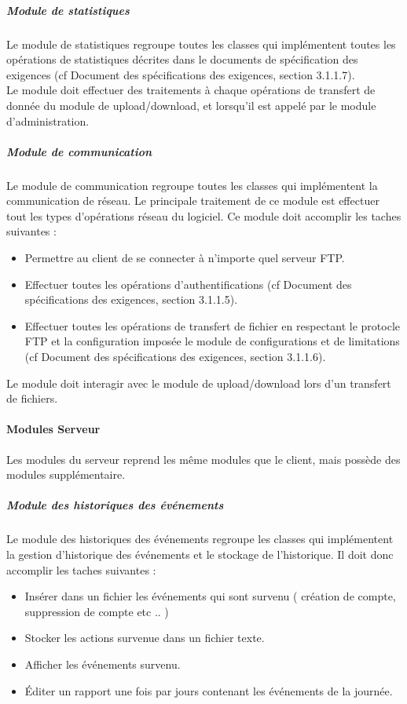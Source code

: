 \documentclass[10pt,a4paper]{report}
\begin{document}
				\subparagraph{Module de statistiques}
				\begin{flushleft}
				Le module de statistiques regroupe toutes les classes qui implémentent toutes les opérations de statistiques décrites dans le documents de  spécification des exigences (cf Document des spécifications des exigences, section 3.1.1.7).\\
				Le module doit effectuer des traitements à chaque opérations de transfert de donnée du module de upload/download, et lorsqu'il est appelé par le module d'administration.
				\end{flushleft}
				
	
				\subparagraph{Module de communication}
				\begin{flushleft}
				Le module de communication regroupe toutes les classes qui implémentent la communication de réseau. Le principale traitement de ce module est effectuer tout les types d'opérations réseau du logiciel. Ce module doit accomplir les taches suivantes :
				\begin{itemize}
					\item Permettre au client de se connecter à n'importe quel serveur FTP.
					\item Effectuer toutes les opérations d'authentifications (cf Document des spécifications des exigences, section 3.1.1.5).
					\item Effectuer toutes les opérations de transfert de fichier en respectant le protocle FTP et la configuration imposée le module de configurations et de limitations (cf Document des spécifications des exigences, section 3.1.1.6).
				\end{itemize}
				
				Le module doit interagir avec le module de upload/download lors d'un transfert de fichiers.\\
				\end{flushleft}
				
				
			\paragraph{Modules Serveur}
				Les modules du serveur reprend les même modules que le client, mais possède des modules supplémentaire. 
				
				\subparagraph{Module des historiques des événements}
				\begin{flushleft}
					Le module des historiques des événements regroupe les classes qui implémentent la gestion d'historique des événements et le stockage de l'historique. Il doit donc accomplir les taches suivantes : 
					\begin{itemize}
						\item Insérer dans un fichier les événements qui sont survenu ( création de compte, suppression de compte etc .. )
						\item Stocker les actions survenue dans un fichier texte.
						\item Afficher les événements survenu.
						\item Éditer un rapport une fois par jours contenant les événements de la journée.
					\end{itemize}
				\end{flushleft}
				
\end{document}
